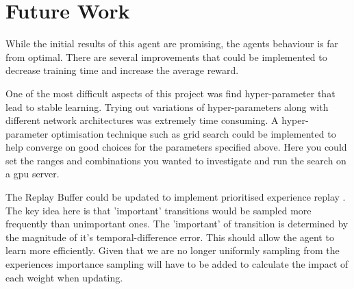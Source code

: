 \documentclass[12pt]{article}
\begin{document}
\section{Future Work}
While the initial results of this agent are promising, the agents behaviour is far from optimal.
There are several improvements that could be implemented to decrease training time and increase the average reward.

One of the most difficult aspects of this project was find hyper-parameter that lead to stable learning.
Trying out variations of hyper-parameters along with different network architectures was extremely time consuming.
A hyper-parameter optimisation technique such as grid search could be implemented to help converge on good choices for the parameters 
specified above. 
Here you could set the ranges and combinations you wanted to investigate and run the search on a gpu server.

The Replay Buffer could be updated to implement prioritised experience replay \cite{per_paper}. 
The key idea here is that 'important' transitions would be sampled more frequently than unimportant ones. 
The 'important' of transition is determined by the magnitude of it's temporal-difference error.
This should allow the agent to learn more efficiently. 
Given that we are no longer uniformly sampling from the experiences importance sampling will have to be added to calculate the impact of each weight when updating.

\printbibliography
\end{document}
